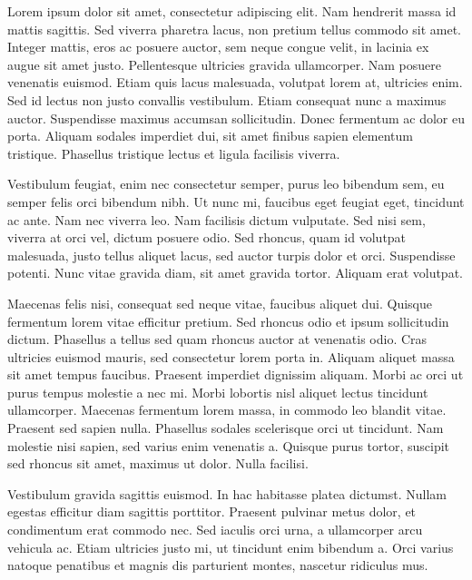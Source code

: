 \documentclass[
12pt, %
oneside, %
english, %
onehalfspacing, %
parskip, %
headsepline, %
chapterinoneline, %
]{MastersDoctoralThesis} %
\begin{document}
\begin{acknowledgements}
\addchaptertocentry{\acknowledgementname} %
Lorem ipsum dolor sit amet, consectetur adipiscing elit. Nam hendrerit massa id mattis sagittis. Sed viverra pharetra lacus, non pretium tellus commodo sit amet. Integer mattis, eros ac posuere auctor, sem neque congue velit, in lacinia ex augue sit amet justo. Pellentesque ultricies gravida ullamcorper. Nam posuere venenatis euismod. Etiam quis lacus malesuada, volutpat lorem at, ultricies enim. Sed id lectus non justo convallis vestibulum. Etiam consequat nunc a maximus auctor. Suspendisse maximus accumsan sollicitudin. Donec fermentum ac dolor eu porta. Aliquam sodales imperdiet dui, sit amet finibus sapien elementum tristique. Phasellus tristique lectus et ligula facilisis viverra.

Vestibulum feugiat, enim nec consectetur semper, purus leo bibendum sem, eu semper felis orci bibendum nibh. Ut nunc mi, faucibus eget feugiat eget, tincidunt ac ante. Nam nec viverra leo. Nam facilisis dictum vulputate. Sed nisi sem, viverra at orci vel, dictum posuere odio. Sed rhoncus, quam id volutpat malesuada, justo tellus aliquet lacus, sed auctor turpis dolor et orci. Suspendisse potenti. Nunc vitae gravida diam, sit amet gravida tortor. Aliquam erat volutpat.

Maecenas felis nisi, consequat sed neque vitae, faucibus aliquet dui. Quisque fermentum lorem vitae efficitur pretium. Sed rhoncus odio et ipsum sollicitudin dictum. Phasellus a tellus sed quam rhoncus auctor at venenatis odio. Cras ultricies euismod mauris, sed consectetur lorem porta in. Aliquam aliquet massa sit amet tempus faucibus. Praesent imperdiet dignissim aliquam. Morbi ac orci ut purus tempus molestie a nec mi. Morbi lobortis nisl aliquet lectus tincidunt ullamcorper. Maecenas fermentum lorem massa, in commodo leo blandit vitae. Praesent sed sapien nulla. Phasellus sodales scelerisque orci ut tincidunt. Nam molestie nisi sapien, sed varius enim venenatis a. Quisque purus tortor, suscipit sed rhoncus sit amet, maximus ut dolor. Nulla facilisi.

Vestibulum gravida sagittis euismod. In hac habitasse platea dictumst. Nullam egestas efficitur diam sagittis porttitor. Praesent pulvinar metus dolor, et condimentum erat commodo nec. Sed iaculis orci urna, a ullamcorper arcu vehicula ac. Etiam ultricies justo mi, ut tincidunt enim bibendum a. Orci varius natoque penatibus et magnis dis parturient montes, nascetur ridiculus mus.
\end{acknowledgements}
\end{document}
